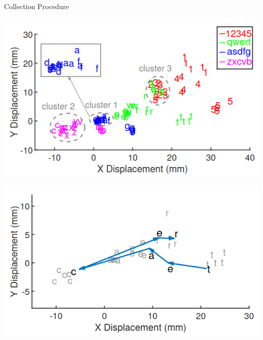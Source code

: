 \documentclass[ucs,9pt]{beamer}
\begin{document}
\begin{frame}{Collection Procedure}
\begin{minipage}[c]{0.49\linewidth}
	\includegraphics[width=\textwidth]{imgs/displacement}
\end{minipage}
\begin{minipage}[c]{0.49\linewidth}
	\includegraphics[width=\textwidth]{imgs/displacement2}

\end{minipage}
\end{frame}
\end{document}
